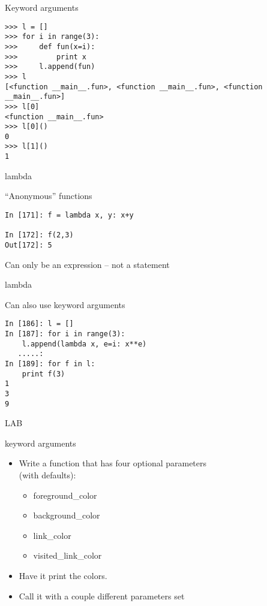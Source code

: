 \documentclass{beamer}
\begin{document}
\begin{frame}[fragile]{Keyword arguments}

\begin{verbatim}
>>> l = []
>>> for i in range(3):
>>>     def fun(x=i):
>>>         print x
>>>     l.append(fun)
>>> l
[<function __main__.fun>, <function __main__.fun>, <function __main__.fun>]
>>> l[0]
<function __main__.fun>
>>> l[0]()
0
>>> l[1]()
1
\end{verbatim}

\end{frame} 

\begin{frame}[fragile]{lambda}

{\Large``Anonymous'' functions}

\vfill
\begin{verbatim}
In [171]: f = lambda x, y: x+y

In [172]: f(2,3)
Out[172]: 5
\end{verbatim}

\vfill
{\Large Can only be an expression -- not a statement}

\end{frame} 

\begin{frame}[fragile]{lambda}

{\Large Can also use keyword arguments}

\begin{verbatim}
In [186]: l = []
In [187]: for i in range(3):
    l.append(lambda x, e=i: x**e)
   .....:     
In [189]: for f in l:
    print f(3)
1
3
9
\end{verbatim}

\end{frame} 

\begin{frame}{LAB}

{\Large keyword arguments}
\begin{itemize}
  \item Write a function that has four optional parameters\\
        (with defaults):
  \begin{itemize}
      \item foreground\_color
      \item background\_color
      \item link\_color
      \item visited\_link\_color
  \end{itemize}
  \item Have it print the colors.
  \item Call it with a couple different parameters set 
\end{itemize}

\end{frame}
\end{document}
